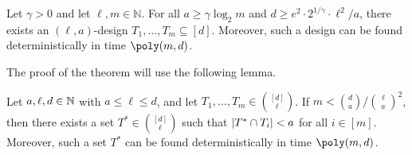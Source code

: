 \begin{theorem}\label{thm:design}
  Let $\gamma > 0 $ and let $\ell, m \in \mathbb{N}$. For all $a \ge \gamma
  \log_2{m}$ and $d \ge e^2 \cdot 2^{1/\gamma} \cdot \ell^2/a$, there exists an
  $(\ell, a)$-design $T_1, \dots, T_m \subseteq [d]$. Moreover, such a design
  can be found deterministically in time $\poly(m, d)$.
\end{theorem}

The proof of the theorem will use the following lemma.
\begin{lemma}\label{lem:design}
  Let $a, \ell, d \in \mathbb{N}$ with $a \le \ell \le d$, and let $T_1, \dots, T_m \in
  \binom{[d]}{\ell}$. If $m < \binom{d}{a} / \binom{\ell}{a}^2$, then there
  exists a set $T^* \in \binom{[d]}{\ell}$ such that $\lvert T^* \cap T_i\rvert < a$
  for all $i \in [m]$. Moreover, such a set $T^*$ can be found
  deterministically in time $\poly(m, d)$.
\end{lemma}

